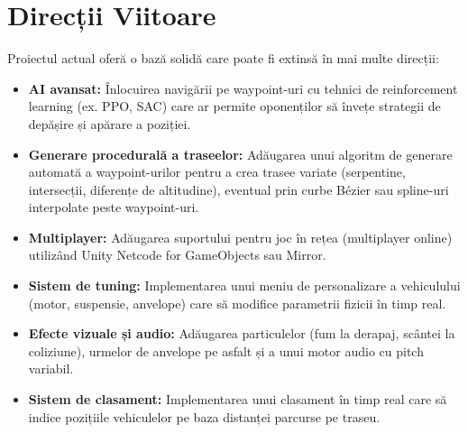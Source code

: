 \section{Direcții Viitoare}
\label{sec:future_work}

Proiectul actual oferă o bază solidă care poate fi extinsă în mai multe direcții:

\begin{itemize}
    \item \textbf{AI avansat:} Înlocuirea navigării pe waypoint-uri cu tehnici de reinforcement learning (ex. PPO, SAC) care ar permite oponenților să învețe strategii de depășire și apărare a poziției.
    
    \item \textbf{Generare procedurală a traseelor:} Adăugarea unui algoritm de generare automată a waypoint-urilor pentru a crea trasee variate (serpentine, intersecții, diferențe de altitudine), eventual prin curbe Bézier sau spline-uri interpolate peste waypoint-uri.
    
    \item \textbf{Multiplayer:} Adăugarea suportului pentru joc în rețea (multiplayer online) utilizând Unity Netcode for GameObjects sau Mirror.
    
    \item \textbf{Sistem de tuning:} Implementarea unui meniu de personalizare a vehiculului (motor, suspensie, anvelope) care să modifice parametrii fizicii în timp real.
    
    \item \textbf{Efecte vizuale și audio:} Adăugarea particulelor (fum la derapaj, scântei la coliziune), urmelor de anvelope pe asfalt și a unui motor audio cu pitch variabil.
    
    \item \textbf{Sistem de clasament:} Implementarea unui clasament în timp real care să indice pozițiile vehiculelor pe baza distanței parcurse pe traseu.
\end{itemize}
